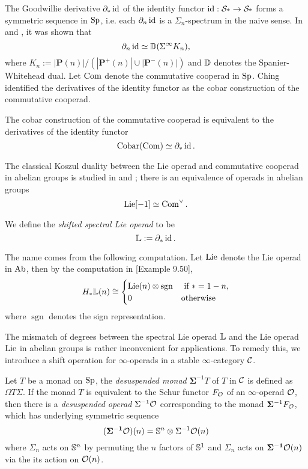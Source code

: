 	The Goodwillie derivative $\partial_* \operatorname{id}$ of the identity functor $\operatorname{id}: \operatorname{\mathcal{S}_{*}} \to \operatorname{\mathcal{S}_{*}}$ forms a symmetric sequence in $\operatorname{Sp}$, i.e. each $\partial_n \operatorname{id}$ is a $\Sigma_n$-spectrum in the naive sense. In \cite{JohnsonDerivative} and \cite{Arone-Mahowald}, it was shown that
	$$
	\partial_n \operatorname{id} \simeq {\mathbb{D}}(\Sigma^{\infty} K_n),
	$$
	where 
	$
	K_{n}:=|\mathbf{P}(n)| /\left(\left|\mathbf{P}^{+}(n)\right| \cup\left|\mathbf{P}^{-}(n)\right|\right)
	$
	and ${\mathbb{D}}$ denotes the Spanier-Whitehead dual. 
	Let $\operatorname{Com}$ denote the commutative cooperad in $\operatorname{Sp}$.
	Ching \cite{ChingBar} identified the derivatives of the identity functor as the cobar construction of the commutative cooperad.
	\begin{proposition}
	\cite[Remark 8.9]{ChingBar}
	The cobar construction of the commutative cooperad is equivalent to the derivatives of the identity functor
	$$
	\operatorname{Cobar}(\operatorname{Com})\simeq \partial_* \operatorname{id}.
	$$
	\end{proposition}
	
	\begin{remark}
    The classical Koszul duality between the Lie operad and commutative cooperad in abelian groups is studied in \cite{Ginzburg-Kapranov} and \cite{Loday-Vallette};
    there is an equivalence of operads in abelian groups
    \[
    \operatorname{Lie}[-1] \simeq \operatorname{Com}^{\vee}.
    \]
    \end{remark}
    
	\begin{definition}
	\label{Shifted Spectral Lie Operad}
	    	We define the \emph{shifted spectral Lie operad} to be
	    	$$
	    	{\mathbb{L}}:= \partial_* \operatorname{id}.
	    	$$
	\end{definition}

	The name comes from the following computation. Let $\operatorname{Lie}$ denote the Lie operad in $\operatorname{Ab}$, then by the computation in \cite{ChingBar}[Example 9.50],
	$$
	H_{*}{\mathbb{L}}(n) \cong 	
	\begin{cases}
	\operatorname{Lie}(n) \otimes \operatorname{sgn}& \text{ if $*=1-n$},\\
	0 & \text{otherwise}
	\end{cases}
	$$	
	where $\operatorname{sgn}$ denotes the sign representation.


The mismatch of degrees between the spectral Lie operad ${\mathbb{L}}$ and the Lie operad $\operatorname{Lie}$ in abelian groups is rather inconvenient for applications. To remedy this, we introduce a shift operation for $\infty$-operads in a stable $\infty$-category ${\mathcal{C}}$. 
\begin{definition}
\cite[Section 3]{Camarena_mod2_free_spectral_Lie_algebra} 
    Let $T$ be a monad on $\operatorname{Sp}$, the \emph{desuspended monad} $\mathbf{\Sigma}^{-1}  T$ of $T$ in ${\mathcal{C}}$ is defined as 
	$
	\Omega T\Sigma.
	$
	If the monad $T$ is equivalent to the Schur functor $F_{{\mathcal{O}}}$ of an $\infty$-operad ${\mathcal{O}}$, then there is a \emph{desuspended operad} $\Sigma^{-1}{\mathcal{O}}$ corresponding to the monad $\mathbf{\Sigma}^{-1} F_{{\mathcal{O}}}$, which has underlying symmetric sequence 
	$$
	(\mathbf{\Sigma^{-1}} {\mathcal{O}} ) (n)= {\mathbb{S}}^{n}\otimes\Sigma^{-1} {\mathcal{O}}(n)
	$$
	where $\Sigma_n$ acts on ${\mathbb{S}}^{n}$ by permuting the $n$ factors of ${\mathbb{S}}^{1}$ and $\Sigma_n$ acts on $\mathbf{\Sigma^{-1}} {\mathcal{O}}(n)$ via the its action on ${\mathcal{O}}(n)$.
\end{definition}

